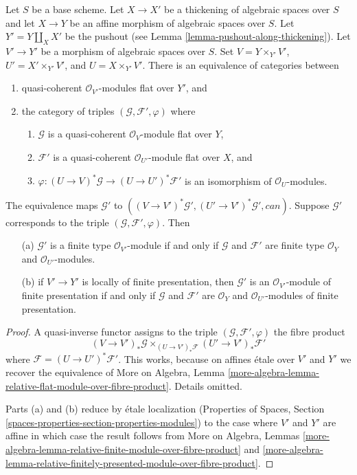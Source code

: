 \begin{lemma}
\label{lemma-space-over-pushout-flat-modules}
Let $S$ be a base scheme.
Let $X \to X'$ be a thickening of algebraic spaces over $S$
and let $X \to Y$ be an affine morphism of algebraic spaces over $S$.
Let $Y' = Y \amalg_X X'$ be the pushout
(see Lemma \ref{lemma-pushout-along-thickening}).
Let $V' \to Y'$ be a morphism of algebraic spaces over $S$. Set
$V = Y \times_{Y'} V'$, $U' = X' \times_{Y'} V'$, and $U = X \times_{Y'} V'$.
There is an equivalence of categories between
\begin{enumerate}
\item quasi-coherent $\mathcal{O}_{V'}$-modules flat over $Y'$, and
\item the category of triples $(\mathcal{G}, \mathcal{F}', \varphi)$ where
\begin{enumerate}
\item $\mathcal{G}$ is a quasi-coherent $\mathcal{O}_V$-module flat over $Y$,
\item $\mathcal{F}'$ is a quasi-coherent $\mathcal{O}_{U'}$-module flat
over $X$, and
\item $\varphi : (U \to V)^*\mathcal{G} \to (U \to U')^*\mathcal{F}'$
is an isomorphism of $\mathcal{O}_U$-modules.
\end{enumerate}
\end{enumerate}
The equivalence maps $\mathcal{G}'$ to
$((V \to V')^*\mathcal{G}', (U' \to V')^*\mathcal{G}', can)$.
Suppose $\mathcal{G}'$ corresponds to the triple
$(\mathcal{G}, \mathcal{F}', \varphi)$. Then
\begin{enumerate}
\item[(a)] $\mathcal{G}'$ is a finite type $\mathcal{O}_{V'}$-module if and
only if $\mathcal{G}$ and $\mathcal{F}'$ are finite type
$\mathcal{O}_Y$ and $\mathcal{O}_{U'}$-modules.
\item[(b)] if $V' \to Y'$ is locally of finite presentation, then
$\mathcal{G}'$ is an $\mathcal{O}_{V'}$-module of finite
presentation if and only if $\mathcal{G}$ and $\mathcal{F}'$ are
$\mathcal{O}_Y$ and $\mathcal{O}_{U'}$-modules of finite presentation.
\end{enumerate}
\end{lemma}

\begin{proof}
A quasi-inverse functor assigns to the triple
$(\mathcal{G}, \mathcal{F}', \varphi)$ the fibre product
$$
(V \to V')_*\mathcal{G}
\times_{(U \to V')_*\mathcal{F}}
(U' \to V')_*\mathcal{F}'
$$
where $\mathcal{F} = (U \to U')^*\mathcal{F}'$. This works, because on
affines \'etale over $V'$ and $Y'$ we recover the equivalence of
More on Algebra, Lemma
\ref{more-algebra-lemma-relative-flat-module-over-fibre-product}.
Details omitted.

\medskip\noindent
Parts (a) and (b) reduce by \'etale localization
(Properties of Spaces, Section
\ref{spaces-properties-section-properties-modules})
to the case where $V'$ and $Y'$ are affine in which case the result
follows from
More on Algebra, Lemmas
\ref{more-algebra-lemma-relative-finite-module-over-fibre-product} and
\ref{more-algebra-lemma-relative-finitely-presented-module-over-fibre-product}.
\end{proof}


